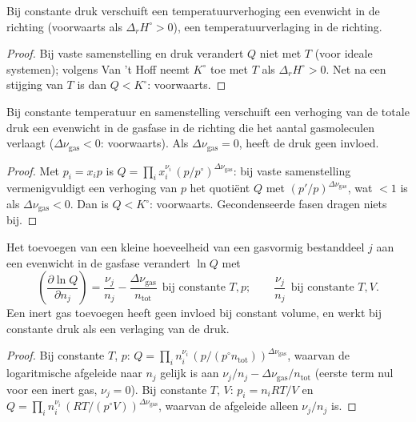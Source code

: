 \begin{proposition}[Temperatuur]\label{prop:b2:equilibrium-shifts:temperature}
Bij constante druk verschuift een temperatuurverhoging een evenwicht in de
 richting (voorwaarts als $\Delta_r H^\circ > 0$), een temperatuurverlaging in de
 richting.
\end{proposition}

\begin{proof}
Bij vaste samenstelling en druk verandert $Q$ niet met $T$ (voor ideale
systemen); volgens Van 't Hoff neemt $K^\circ$ toe met $T$ als $\Delta_r H^\circ >
0$. Net na een stijging van $T$ is dan $Q < K^\circ$: voorwaarts.
\end{proof}

\begin{proposition}[Druk]\label{prop:b2:equilibrium-shifts:pressure}
Bij constante temperatuur en samenstelling verschuift een verhoging van de totale druk een
evenwicht in de gasfase in de richting die het aantal gasmoleculen
verlaagt ($\Delta\nu_{\text{gas}} < 0$: voorwaarts). Als $\Delta\nu_{\text{gas}}
= 0$, heeft de druk geen invloed.
\end{proposition}

\begin{proof}
Met $p_i = x_ip$ is $Q = \prod_i x_i^{\nu_i}\,(p/p^\circ)^{\Delta\nu_{\text{gas}}}$:
bij vaste samenstelling vermenigvuldigt een verhoging van $p$ het quotiënt $Q$ met
$(p'/p)^{\Delta\nu_{\text{gas}}}$, wat $< 1$ is als $\Delta\nu_{\text{gas}} <
0$. Dan is $Q < K^\circ$: voorwaarts. Gecondenseerde fasen dragen niets bij.
\end{proof}

\begin{proposition}\label{prop:b2:equilibrium-shifts:adding}
Het toevoegen van een kleine hoeveelheid van een gasvormig bestanddeel $j$ aan een evenwicht in de gasfase
verandert $\ln Q$ met
\[
  \left(\frac{\partial\ln Q}{\partial n_j}\right) = \frac{\nu_j}{n_j} -
  \frac{\Delta\nu_{\text{gas}}}{n_{\text{tot}}}\ \ \text{bij constante } T, p ;
  \qquad \frac{\nu_j}{n_j}\ \ \text{bij constante } T, V .
\]
Een inert gas toevoegen heeft geen invloed bij constant volume, en werkt bij constante druk
als een verlaging van de druk.
\end{proposition}

\begin{proof}
Bij constante $T$, $p$: $Q = \prod_i n_i^{\nu_i}\,(p/(p^\circ n_{\text{tot}}))^{
\Delta\nu_{\text{gas}}}$, waarvan de logaritmische afgeleide naar $n_j$ gelijk is aan
$\nu_j/n_j - \Delta\nu_{\text{gas}}/n_{\text{tot}}$ (eerste term nul voor een inert
gas, $\nu_j = 0$). Bij constante $T$, $V$: $p_i = n_iRT/V$ en $Q = \prod_i n_i^{
\nu_i}\,(RT/(p^\circ V))^{\Delta\nu_{\text{gas}}}$, waarvan de afgeleide alleen
$\nu_j/n_j$ is.
\end{proof}

